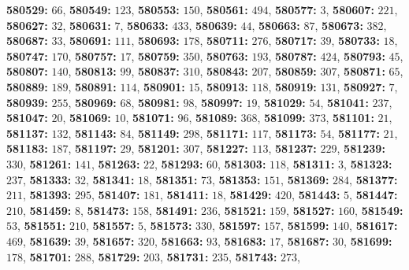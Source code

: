 \textsf{\bfseries 580529:} $66$, \textsf{\bfseries 580549:} $123$, \textsf{\bfseries 580553:} $150$, \textsf{\bfseries 580561:} $494$, \textsf{\bfseries 580577:} $3$, \textsf{\bfseries 580607:} $221$, \textsf{\bfseries 580627:} $32$, \textsf{\bfseries 580631:} $7$, \textsf{\bfseries 580633:} $433$, \textsf{\bfseries 580639:} $44$, \textsf{\bfseries 580663:} $87$, \textsf{\bfseries 580673:} $382$, \textsf{\bfseries 580687:} $33$, \textsf{\bfseries 580691:} $111$, \textsf{\bfseries 580693:} $178$, \textsf{\bfseries 580711:} $276$, \textsf{\bfseries 580717:} $39$, \textsf{\bfseries 580733:} $18$, \textsf{\bfseries 580747:} $170$, \textsf{\bfseries 580757:} $17$, \textsf{\bfseries 580759:} $350$, \textsf{\bfseries 580763:} $193$, \textsf{\bfseries 580787:} $424$, \textsf{\bfseries 580793:} $45$, \textsf{\bfseries 580807:} $140$, \textsf{\bfseries 580813:} $99$, \textsf{\bfseries 580837:} $310$, \textsf{\bfseries 580843:} $207$, \textsf{\bfseries 580859:} $307$, \textsf{\bfseries 580871:} $65$, \textsf{\bfseries 580889:} $189$, \textsf{\bfseries 580891:} $114$, \textsf{\bfseries 580901:} $15$, \textsf{\bfseries 580913:} $118$, \textsf{\bfseries 580919:} $131$, \textsf{\bfseries 580927:} $7$, \textsf{\bfseries 580939:} $255$, \textsf{\bfseries 580969:} $68$, \textsf{\bfseries 580981:} $98$, \textsf{\bfseries 580997:} $19$, \textsf{\bfseries 581029:} $54$, \textsf{\bfseries 581041:} $237$, \textsf{\bfseries 581047:} $20$, \textsf{\bfseries 581069:} $10$, \textsf{\bfseries 581071:} $96$, \textsf{\bfseries 581089:} $368$, \textsf{\bfseries 581099:} $373$, \textsf{\bfseries 581101:} $21$, \textsf{\bfseries 581137:} $132$, \textsf{\bfseries 581143:} $84$, \textsf{\bfseries 581149:} $298$, \textsf{\bfseries 581171:} $117$, \textsf{\bfseries 581173:} $54$, \textsf{\bfseries 581177:} $21$, \textsf{\bfseries 581183:} $187$, \textsf{\bfseries 581197:} $29$, \textsf{\bfseries 581201:} $307$, \textsf{\bfseries 581227:} $113$, \textsf{\bfseries 581237:} $229$, \textsf{\bfseries 581239:} $330$, \textsf{\bfseries 581261:} $141$, \textsf{\bfseries 581263:} $22$, \textsf{\bfseries 581293:} $60$, \textsf{\bfseries 581303:} $118$, \textsf{\bfseries 581311:} $3$, \textsf{\bfseries 581323:} $237$, \textsf{\bfseries 581333:} $32$, \textsf{\bfseries 581341:} $18$, \textsf{\bfseries 581351:} $73$, \textsf{\bfseries 581353:} $151$, \textsf{\bfseries 581369:} $284$, \textsf{\bfseries 581377:} $211$, \textsf{\bfseries 581393:} $295$, \textsf{\bfseries 581407:} $181$, \textsf{\bfseries 581411:} $18$, \textsf{\bfseries 581429:} $420$, \textsf{\bfseries 581443:} $5$, \textsf{\bfseries 581447:} $210$, \textsf{\bfseries 581459:} $8$, \textsf{\bfseries 581473:} $158$, \textsf{\bfseries 581491:} $236$, \textsf{\bfseries 581521:} $159$, \textsf{\bfseries 581527:} $160$, \textsf{\bfseries 581549:} $53$, \textsf{\bfseries 581551:} $210$, \textsf{\bfseries 581557:} $5$, \textsf{\bfseries 581573:} $330$, \textsf{\bfseries 581597:} $157$, \textsf{\bfseries 581599:} $140$, \textsf{\bfseries 581617:} $469$, \textsf{\bfseries 581639:} $39$, \textsf{\bfseries 581657:} $320$, \textsf{\bfseries 581663:} $93$, \textsf{\bfseries 581683:} $17$, \textsf{\bfseries 581687:} $30$, \textsf{\bfseries 581699:} $178$, \textsf{\bfseries 581701:} $288$, \textsf{\bfseries 581729:} $203$, \textsf{\bfseries 581731:} $235$, \textsf{\bfseries 581743:} $273$, 
